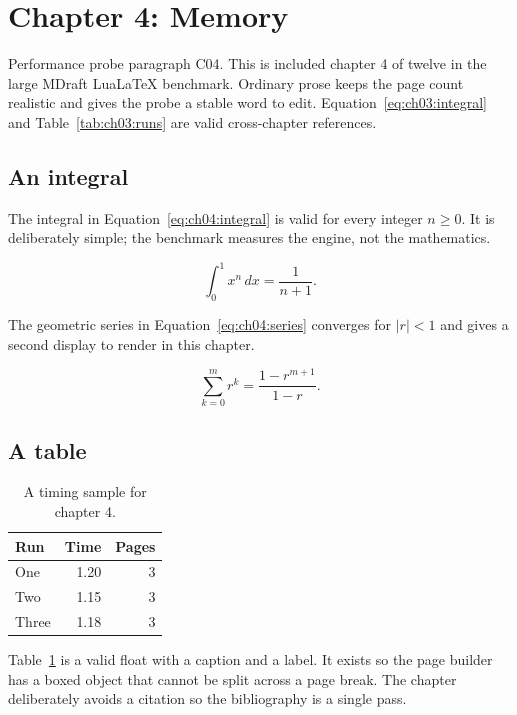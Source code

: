 \section{Chapter 4: Memory}
\label{sec:ch04}

Performance probe paragraph C04. This is included chapter 4 of twelve in
the large MDraft LuaLaTeX benchmark. Ordinary prose keeps the page count
realistic and gives the probe a stable word to edit. Equation~\ref{eq:ch03:integral} and
Table~\ref{tab:ch03:runs} are valid cross-chapter references.

\subsection{An integral}
The integral in Equation~\ref{eq:ch04:integral} is valid for every integer
$n \ge 0$. It is deliberately simple; the benchmark measures the engine, not
the mathematics.

\begin{equation}
  \label{eq:ch04:integral}
  \int_{0}^{1} x^{n}\,dx = \frac{1}{n+1}.
\end{equation}

The geometric series in Equation~\ref{eq:ch04:series} converges for
$|r| < 1$ and gives a second display to render in this chapter.

\begin{equation}
  \label{eq:ch04:series}
  \sum_{k=0}^{m} r^{k} = \frac{1-r^{m+1}}{1-r}.
\end{equation}

\subsection{A table}
\begin{table}[h]
  \centering
  \begin{tabular}{lrr}
    \toprule
    Run & Time & Pages \\
    \midrule
    One   & 1.20 & 3 \\
    Two   & 1.15 & 3 \\
    Three & 1.18 & 3 \\
    \bottomrule
  \end{tabular}
  \caption{A timing sample for chapter 4.}
  \label{tab:ch04:runs}
\end{table}

Table~\ref{tab:ch04:runs} is a valid float with a caption and a label. It
exists so the page builder has a boxed object that cannot be split across a
page break. The chapter deliberately avoids a citation so the bibliography is a single pass.

